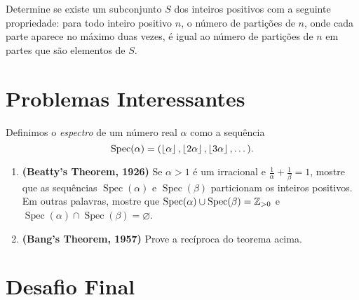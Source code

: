 \documentclass[10pt, a4paper]{article}
\DeclareMathOperator\Spec{Spec}
\begin{document}
	\begin{prob}
		Determine se existe um subconjunto $S$ dos inteiros positivos com a seguinte propriedade: para todo inteiro positivo $n$, o número de partições de $n$, onde cada parte aparece no máximo duas vezes, é igual ao número de partições de $n$ em partes que são elementos de $S$.
	\end{prob}

	\section{Problemas Interessantes}


	


	\begin{prob}
		Definimos o \emph{espectro} de um número real $\alpha$ como a sequência \[\Spec(\alpha) = (\floor{\alpha}, \floor{2\alpha}, \floor{3\alpha}, \dots).\]
		\begin{enumerate}[label = (\alph*)]
			\item \textbf{(Beatty's Theorem, 1926)} Se $\alpha > 1$ é um irracional e $\frac{1}{\alpha} + \frac{1}{\beta} = 1$, mostre que as sequências $\Spec(\alpha)$ e $\Spec(\beta)$ particionam os inteiros positivos. Em outras palavras, mostre que $\Spec(\alpha) \cup \Spec(\beta) = \ZZ_{>0}$ e $\Spec(\alpha) \cap \Spec(\beta) = \varnothing$. 
			\item \textbf{(Bang’s Theorem, 1957)} Prove a recíproca do teorema acima.
		\end{enumerate}
	\end{prob}

	\section{Desafio Final}


	

	
\end{document}

